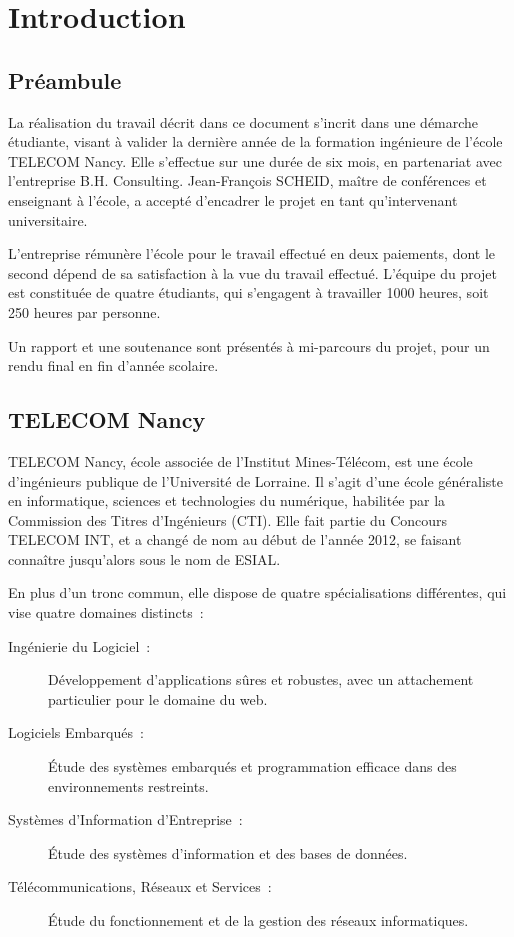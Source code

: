 \newcommand{\titreA}{Secure Network Access Control for Kids}
\newcommand{\titreB}{Rapport de projet industriel}


\listoffigures
\newpage

\section{Introduction}
\subsection{Préambule}

La réalisation du travail décrit dans ce document s'incrit dans une démarche étudiante, visant à valider la dernière année de la formation ingénieure de l'école TELECOM Nancy. Elle s'effectue sur une durée de six mois, en partenariat avec l'entreprise B.H. Consulting. Jean-François SCHEID, maître de conférences et enseignant à l'école, a accepté d'encadrer le projet en tant qu'intervenant universitaire.

L'entreprise rémunère l'école pour le travail effectué en deux paiements, dont le second dépend de sa satisfaction à la vue du travail effectué. L'équipe du projet est constituée de quatre étudiants, qui s'engagent à travailler 1000 heures, soit 250 heures par personne.

Un rapport et une soutenance sont présentés à mi-parcours du projet, pour un rendu final en fin d'année scolaire.

\subsection{TELECOM Nancy}

TELECOM Nancy, école associée de l'Institut Mines-Télécom, est une école d'ingénieurs publique de l'Université de Lorraine. Il s'agit d'une école généraliste en informatique, sciences et technologies du numérique, habilitée par la Commission des Titres d'Ingénieurs (CTI). Elle fait partie du Concours TELECOM INT, et a changé de nom au début de l'année 2012, se faisant connaître jusqu'alors sous le nom de ESIAL.

En plus d'un tronc commun, elle dispose de quatre spécialisations différentes, qui vise quatre domaines distincts~:

\begin{description}
\item[Ingénierie du Logiciel~:] Développement d'applications sûres et robustes, avec un attachement particulier pour le domaine du web.
\item[Logiciels Embarqués~:] Étude des systèmes embarqués et programmation efficace dans des environnements restreints.
\item[Systèmes d'Information d'Entreprise~:] Étude des systèmes d'information et des bases de données.
\item[Télécommunications, Réseaux et Services~:] Étude du fonctionnement et de la gestion des réseaux informatiques.
\end{description}


